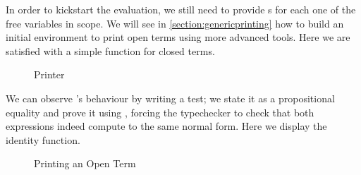 In order to kickstart the evaluation, we still need to provide s for each
one of the free variables in scope. We will see in \cref{section:genericprinting}
how to build an initial environment to print open terms using more advanced tools.
Here we are satisfied with a simple  function for closed terms.

\begin{figure}[h]
\caption{Printer\label{fig:printer}}
\end{figure}

We can observe 's behaviour by writing a test; we state it as a
propositional equality and prove it using , forcing the typechecker
to check that both expressions indeed compute to the same normal form. Here
we display the identity function.

\begin{figure}[h]
\caption{Printing an Open Term\label{fig:printtest}}
\end{figure}
